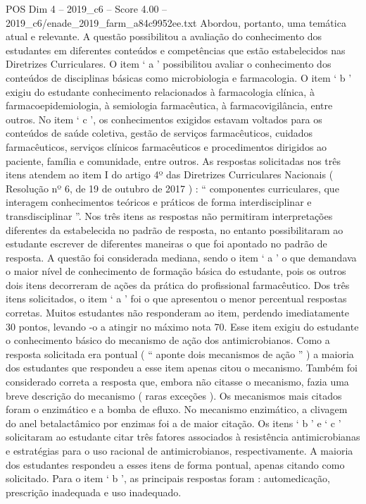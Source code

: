 \begin{textsample}{POS Dim 4 – 2019\_c6 – Score 4.00 – 2019\_c6/enade\_2019\_farm\_a84c9952ee.txt}
Abordou, portanto, uma temática atual e relevante.
A questão possibilitou a avaliação do conhecimento dos estudantes em diferentes conteúdos e competências que estão estabelecidos nas Diretrizes Curriculares.
O item ‘ a ’ possibilitou avaliar o conhecimento dos conteúdos de disciplinas básicas como microbiologia e farmacologia.
O item ‘ b ’ exigiu do estudante conhecimento relacionados à farmacologia clínica, à farmacoepidemiologia, à semiologia farmacêutica, à farmacovigilância, entre outros.
No item ‘ c ’, os conhecimentos exigidos estavam voltados para os conteúdos de saúde coletiva, gestão de serviços farmacêuticos, cuidados farmacêuticos, serviços clínicos farmacêuticos e procedimentos dirigidos ao paciente, família e comunidade, entre outros.
As respostas solicitadas nos três itens atendem ao item I do artigo 4º das Diretrizes Curriculares Nacionais ( Resolução nº 6, de 19 de outubro de 2017 ) : “ componentes curriculares, que interagem conhecimentos teóricos e práticos de forma interdisciplinar e transdisciplinar ”.
Nos três itens as respostas não permitiram interpretações diferentes da estabelecida no padrão de resposta, no entanto possibilitaram ao estudante escrever de diferentes maneiras o que foi apontado no padrão de resposta.
A questão foi considerada mediana, sendo o item ‘ a ’ o que demandava o maior nível de conhecimento de formação básica do estudante, pois os outros dois itens decorreram de ações da prática do profissional farmacêutico.
Dos três itens solicitados, o item ‘ a ’ foi o que apresentou o menor percentual respostas corretas.
Muitos estudantes não responderam ao item, perdendo imediatamente 30 pontos, levando -o a atingir no máximo nota 70.
Esse item exigiu do estudante o conhecimento básico do mecanismo de ação dos antimicrobianos.
Como a resposta solicitada era pontual ( “ aponte dois mecanismos de ação ” ) a maioria dos estudantes que respondeu a esse item apenas citou o mecanismo.
Também foi considerado correta a resposta que, embora não citasse o mecanismo, fazia uma breve descrição do mecanismo ( raras exceções ).
Os mecanismos mais citados foram o enzimático e a bomba de efluxo.
No mecanismo enzimático, a clivagem do anel betalactâmico por enzimas foi a de maior citação.
Os itens ‘ b ’ e ‘ c ’ solicitaram ao estudante citar três fatores associados à resistência antimicrobianas e estratégias para o uso racional de antimicrobianos, respectivamente.
A maioria dos estudantes respondeu a esses itens de forma pontual, apenas citando como solicitado.
Para o item ‘ b ’, as principais respostas foram : automedicação, prescrição inadequada e uso inadequado.

\end{textsample}
